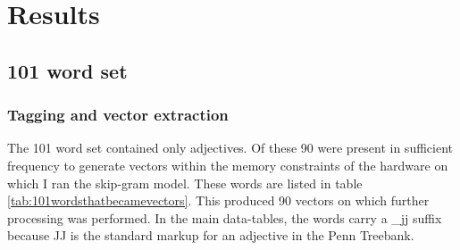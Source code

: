 \documentclass[eric_thesis.tex]{subfiles}
\begin{document}
\chapter{Results}

\section{101 word set}

\subsection{Tagging and vector extraction}

The 101 word set contained only adjectives. Of these 90 were present in 
sufficient frequency to generate vectors within the memory constraints of the 
hardware on which I ran the skip-gram model. These words are listed in table 
\ref{tab:101wordsthatbecamevectors}. This produced 90 vectors on which further 
processing was performed. In the main data-tables, the words carry a \_jj suffix
because JJ is the standard markup for an adjective in the Penn Treebank.
\end{document}
